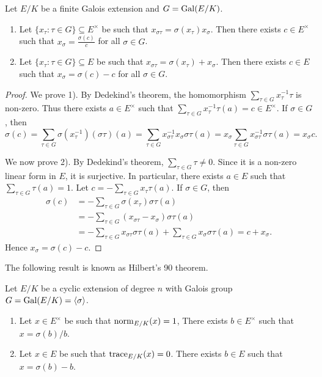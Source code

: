 \begin{proposition}
    Let $E/K$ be a finite Galois extension and $G=\operatorname{Gal}(E/K)$. 
    \begin{enumerate}
        \item Let $\{x_\tau:\tau\in G\}\subseteq E^\times$ be such that 
            $x_{\sigma\tau}=\sigma(x_\tau)x_\sigma$. Then there exists
            $c\in E^\times$ such that $x_\sigma=\frac{\sigma(c)}{c}$ for all $\sigma\in G$. 
        \item Let $\{x_\tau:\tau\in G\}\subseteq E$ be such that 
            $x_{\sigma\tau}=\sigma(x_\tau)+x_\sigma$. Then there exists
            $c\in E$ such that $x_\sigma=\sigma(c)-c$ for all $\sigma\in G$.  
    \end{enumerate}
\end{proposition}

\begin{proof}
    We prove 1). By Dedekind's theorem, the homomorphism 
    $\sum_{\tau\in G}x_{\tau}^{-1}\tau$ is non-zero. Thus there exists
    $a\in E^{\times}$ such that $\sum_{\tau\in G}x_{\tau}^{-1}\tau(a)=c\in E^{\times}$. 
    If $\sigma\in G$, 
    then 
    \[
    \sigma(c)=\sum_{\tau\in G}\sigma(x_{\tau}^{-1})(\sigma\tau)(a)=
    \sum_{\tau\in G}x_{\sigma\tau}^{-1}x_{\sigma}\sigma\tau(a)
    =x_{\sigma}\sum_{\tau\in G}x_{\sigma\tau}^{-1}\sigma\tau(a)=x_{\sigma}c.
    \]
    
    We now prove 2). By Dedekind's theorem, $\sum_{\tau\in G}\tau\ne0$. Since
    it is a non-zero 
    linear form in $E$, it is surjective. In particular, there exists 
    $a\in E$ such that $\sum_{\tau\in G}\tau(a)=1$. Let $c=-\sum_{\tau\in G}x_\tau\tau(a)$. 
    If $\sigma\in G$, then 
    \begin{align*}
        \sigma(c) &= -\sum_{\tau\in G}\sigma(x_{\tau})\sigma\tau(a)\\
        &=-\sum_{\tau\in G}(x_{\sigma\tau}-x_{\sigma})\sigma\tau(a)\\
        &=-\sum_{\tau\in G}x_{\sigma\tau}\sigma\tau(a)+\sum_{\tau\in G}x_{\sigma}\sigma\tau(a)
        =c+x_{\sigma}.
    \end{align*}
    Hence $x_{\sigma}=\sigma(c)-c$. 
\end{proof}

The following result is known as Hilbert's 90 theorem. 

\begin{theorem}
    Let $E/K$ be a cyclic extension of degree $n$ with Galois group $G=\operatorname{Gal}(E/K)=\langle\sigma\rangle$. 
    \begin{enumerate}
        \item Let $x\in E^{\times}$ be such that $\operatorname{norm}_{E/K}(x)=1$, 
        There exists $b\in E^{\times}$ such that $x=\sigma(b)/b$. 
        \item Let  $x\in E$ be such that $\operatorname{trace}_{E/K}(x)=0$. 
        There exists $b\in E$ such that $x=\sigma(b)-b$. 
    \end{enumerate}
\end{theorem}

